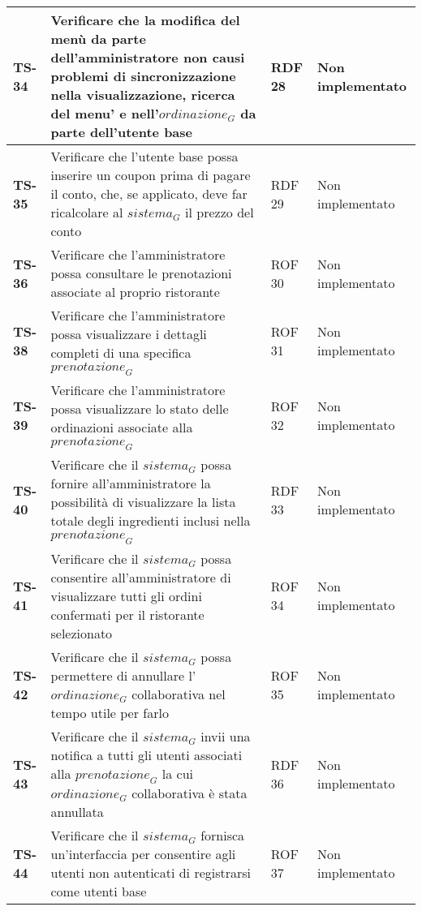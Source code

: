 \begin{longtable}{|>{\centering\arraybackslash}p{1.5cm}|p{9.8cm}|p{2cm}|p{3.5cm}|}
    \hline
    \rowcolor{gray!10}
    \textbf{TS-34} & Verificare che la modifica del menù da parte dell'amministratore non causi problemi di sincronizzazione nella visualizzazione, ricerca del menu' e nell'$\textit{ordinazione}_G$ da parte dell'utente base & RDF 28 & Non implementato \\ 
    \hline
    \rowcolor{gray!10}
    \textbf{TS-35} & Verificare che l'utente base possa inserire un coupon prima di pagare il conto, che, se applicato, deve far ricalcolare al $\textit{sistema}_G$ il prezzo del conto & RDF 29 & Non implementato \\ 
    \hline
    \rowcolor{gray!10}
    \textbf{TS-36} & Verificare che l'amministratore possa consultare le prenotazioni associate al proprio ristorante & ROF 30 & Non implementato \\ 
    \hline
    \rowcolor{gray!10}
    \textbf{TS-38} & Verificare che l'amministratore possa visualizzare i dettagli completi di una specifica $\textit{prenotazione}_G$ & ROF 31 & Non implementato \\ 
    \hline
    \rowcolor{gray!10}
    \textbf{TS-39} & Verificare che l'amministratore possa visualizzare lo stato delle ordinazioni associate alla $\textit{prenotazione}_G$ & ROF 32 & Non implementato \\ 
    \hline
    \rowcolor{gray!10}
    \textbf{TS-40} & Verificare che il $\textit{sistema}_G$ possa fornire all'amministratore la possibilità di visualizzare la lista totale degli ingredienti inclusi nella $\textit{prenotazione}_G$ & RDF 33 & Non implementato \\ 
    \hline
    \rowcolor{gray!10}
    \textbf{TS-41} & Verificare che il $\textit{sistema}_G$ possa consentire all'amministratore di visualizzare tutti gli ordini confermati per il ristorante selezionato & ROF 34 & Non implementato \\ 
    \hline
    \rowcolor{gray!10}
    \textbf{TS-42} & Verificare che il $\textit{sistema}_G$ possa permettere di annullare l'$\textit{ordinazione}_G$ collaborativa nel tempo utile per farlo & ROF 35 & Non implementato \\
    \hline
    \rowcolor{gray!10}
    \textbf{TS-43} & Verificare che il $\textit{sistema}_G$ invii una notifica a tutti gli utenti associati alla $\textit{prenotazione}_G$ la cui $\textit{ordinazione}_G$ collaborativa è stata annullata & RDF 36 & Non implementato \\ 
    \hline
    \rowcolor{gray!10}
    \textbf{TS-44} & Verificare che il $\textit{sistema}_G$ fornisca un'interfaccia per consentire agli utenti non autenticati di registrarsi come utenti base & ROF 37 & Non implementato \\ 

\end{longtable}

